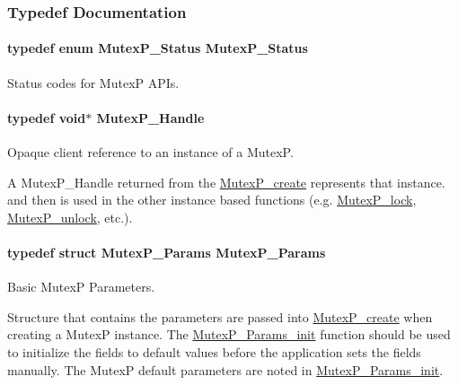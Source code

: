 \subsubsection{Typedef Documentation}
\paragraph[{Mutex\+P\+\_\+\+Status}]{\setlength{\rightskip}{0pt plus 5cm}typedef enum {\bf Mutex\+P\+\_\+\+Status}  {\bf Mutex\+P\+\_\+\+Status}}\label{_mutex_p_8h_a57d61e1b19e6a6e93f9b34795356e431}


Status codes for Mutex\+P A\+P\+Is. 

\paragraph[{Mutex\+P\+\_\+\+Handle}]{\setlength{\rightskip}{0pt plus 5cm}typedef void$\ast$ {\bf Mutex\+P\+\_\+\+Handle}}\label{_mutex_p_8h_a1bf40a0e31521bb036d1180d4338b5d9}


Opaque client reference to an instance of a Mutex\+P. 

A Mutex\+P\+\_\+\+Handle returned from the \hyperlink{_mutex_p_8h_af05d5dc3cadfca5a06572ef7e9ead652}{Mutex\+P\+\_\+create} represents that instance. and then is used in the other instance based functions (e.\+g. \hyperlink{_mutex_p_8h_a2447ad3ba46c2117235253fc4abb4566}{Mutex\+P\+\_\+lock}, \hyperlink{_mutex_p_8h_a3bb8c88366ec4b5c5903bf0f37924486}{Mutex\+P\+\_\+unlock}, etc.). 
\paragraph[{Mutex\+P\+\_\+\+Params}]{\setlength{\rightskip}{0pt plus 5cm}typedef struct {\bf Mutex\+P\+\_\+\+Params}  {\bf Mutex\+P\+\_\+\+Params}}\label{_mutex_p_8h_a96daeded90eff8d2d53b15190530a2a6}


Basic Mutex\+P Parameters. 

Structure that contains the parameters are passed into \hyperlink{_mutex_p_8h_af05d5dc3cadfca5a06572ef7e9ead652}{Mutex\+P\+\_\+create} when creating a Mutex\+P instance. The \hyperlink{_mutex_p_8h_a023e95c8429aa68dcbb98adacb1ac381}{Mutex\+P\+\_\+\+Params\+\_\+init} function should be used to initialize the fields to default values before the application sets the fields manually. The Mutex\+P default parameters are noted in \hyperlink{_mutex_p_8h_a023e95c8429aa68dcbb98adacb1ac381}{Mutex\+P\+\_\+\+Params\+\_\+init}. 


